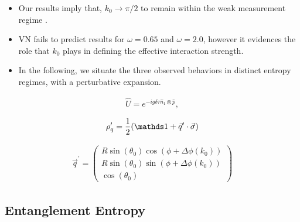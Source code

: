 \documentclass[10pt,
 amsmath,amssymb,
 aps,prb, twocolumn
]{revtex4-2}
\begin{document}
\begin{itemize}
    \item Our results imply that, $k_0\rightarrow \pi/2$ to remain within the weak measurement regime . 

  \item VN fails to predict results for $\omega=0.65$ and $\omega=2.0$, however it evidences the role that $k_0$ plays  in defining the effective interaction strength.
   
    \item In the following, we situate the three observed behaviors in distinct entropy regimes, with a perturbative expansion.
\end{itemize}


\begin{align}\label{eq:von_neumann_H}
    \hat{U} = e^{-i g\delta \tau \hat{n}_1 \otimes \hat{p}},
\end{align}

\begin{align}\label{eq:qubit_rho}
    \rho_q^\prime = \frac{1}{2}(\id + \vec{q}^\prime \cdot \vec{\sigma})
\end{align}

\begin{align}\label{eq:new_q}
 \vec{q}^\prime = 
    \begin{pmatrix}
    R \sin(\theta_0) \cos(\phi + \Delta \phi(k_0)) \\
    R \sin(\theta_0) \sin(\phi + \Delta \phi(k_0)) \\
    \cos(\theta_0)
    \end{pmatrix}
\end{align}

\subsection{Entanglement Entropy}\label{sect:entanglement}
\end{document}
